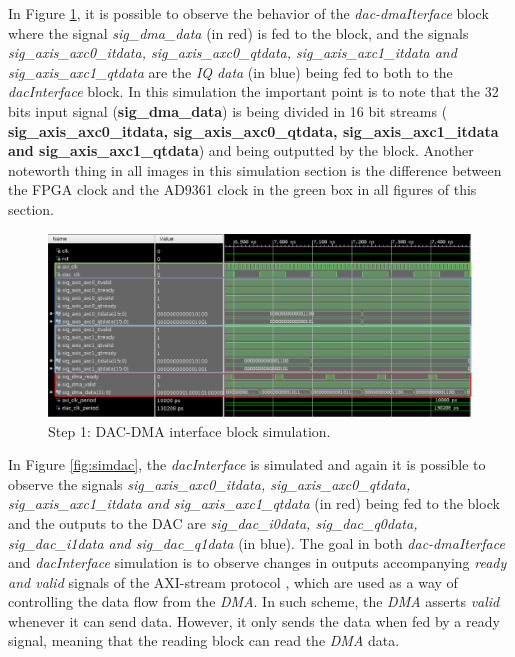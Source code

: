 In Figure \ref{fig:simdacdma}, it is possible to observe the behavior of the
\textit{dac-dmaIterface} block where the signal \textit{sig\_dma\_data} (in red)
is fed to the block, and the signals \textit{ sig\_axis\_axc0\_itdata,
sig\_axis\_axc0\_qtdata, sig\_axis\_axc1\_itdata and sig\_axis\_axc1\_qtdata}
are the \textit{IQ data} (in blue) being fed to both to the
\textit{dacInterface} block. In this simulation the important point is to note
that the 32 bits input signal (\textbf{sig\_dma\_data}) is being divided in 16
bit streams (\textbf{ sig\_axis\_axc0\_itdata, sig\_axis\_axc0\_qtdata,
sig\_axis\_axc1\_itdata and sig\_axis\_axc1\_qtdata}) and being outputted by the
block. Another noteworth thing in all images in this simulation section is the
difference between the FPGA clock and the AD9361 clock in the green box in all
figures of this section.

\begin{figure}[htbp]
    \centering
    \includegraphics[width=1\textwidth]{./figures/dac_dmaInterface_m}
    \caption{ Step 1: DAC-DMA interface block simulation.
    \label{fig:simdacdma}}
\end{figure}

In Figure \ref{fig:simdac}, the \textit{dacInterface} is simulated and again it
is possible to observe the signals \textit{sig\_axis\_axc0\_itdata,
sig\_axis\_axc0\_qtdata, sig\_axis\_axc1\_itdata and sig\_axis\_axc1\_qtdata}
(in red) being fed to the block and the outputs to the DAC are
\textit{sig\_dac\_i0data, sig\_dac\_q0data, sig\_dac\_i1data and
sig\_dac\_q1data} (in blue). The goal in both \textit{dac-dmaIterface} and
\textit{dacInterface} simulation is to observe changes in outputs accompanying
\textit{ready and valid} signals of the AXI-stream protocol \cite{xilinx:axi},
which are used as a way of controlling the data flow from the \textit{DMA}. In
such scheme, the \textit{DMA} asserts \textit{valid} whenever it can send data.
However, it only sends the data when fed by a ready signal, meaning that the
reading block can read the \textit{DMA} data.

